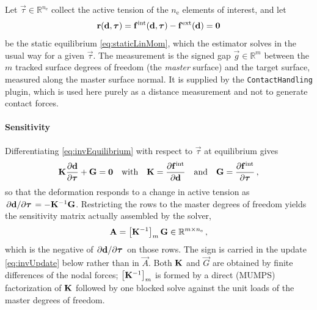 Let $\vec \tau \in \mathbb{R}^{n_\mathrm{e}}$ collect the active tension of the $n_\mathrm{e}$ elements of interest, and let
\begin{equation}
    \vec r(\d, \vec \tau) = \vec f^\mathrm{int}(\d, \vec \tau) - \vec f^\mathrm{ext}(\d) = \vec 0
    \label{eq:invEquilibrium}
\end{equation}
be the static equilibrium \eqref{eq:staticLinMom}, which the estimator solves in the usual way for a given $\vec \tau$.
The measurement is the signed gap $\vec g \in \mathbb{R}^{m}$ between the $m$ tracked surface degrees of freedom (the \emph{master} surface) and the target surface, measured along the master surface normal.
It is supplied by the \verb|ContactHandling| plugin, which is used here purely as a distance measurement and not to generate contact forces.

\paragraph{Sensitivity}
Differentiating \eqref{eq:invEquilibrium} with respect to $\vec \tau$ at equilibrium gives
\begin{equation}
    \K \pdv{\d}{\vec \tau} + \vec G = \vec 0 \qq{with} \K = \pdv{\vec f^\mathrm{int}}{\d} \qq{and} \vec G = \pdv{\vec f^\mathrm{int}}{\vec \tau} \,,
\end{equation}
so that the deformation responds to a change in active tension as $\pdv*{\d}{\vec \tau} = -\K^{-1} \vec G$.
Restricting the rows to the master degrees of freedom yields the sensitivity matrix actually assembled by the solver,
\begin{equation}
    \vec A = \left[ \K^{-1} \right]_{m} \vec G \in \mathbb{R}^{m \times n_\mathrm{e}} \,,
    \label{eq:invSensitivity}
\end{equation}
which is the negative of $\pdv*{\d}{\vec \tau}$ on those rows.
The sign is carried in the update \eqref{eq:invUpdate} below rather than in $\vec A$.
Both $\K$ and $\vec G$ are obtained by finite differences of the nodal forces; $\left[ \K^{-1} \right]_{m}$ is formed by a direct (MUMPS) factorization of $\K$ followed by one blocked solve against the unit loads of the master degrees of freedom.

